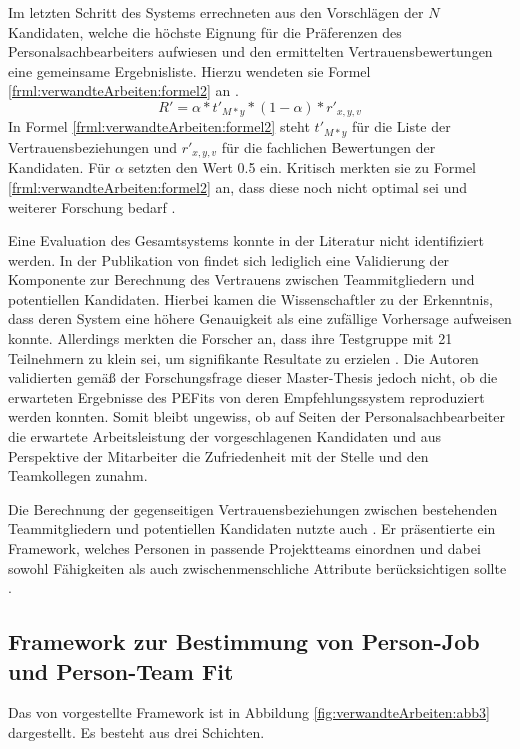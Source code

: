 Im letzten Schritt des Systems errechneten \textcite[S. 9f.]{malinowski:2005} aus den Vorschlägen der $N$ Kandidaten, welche die höchste Eignung für die Präferenzen des Personalsachbearbeiters aufwiesen und den ermittelten Vertrauensbewertungen eine gemeinsame Ergebnisliste. Hierzu wendeten sie Formel \ref{frml:verwandteArbeiten:formel2} an \cite[S.10]{malinowski:2005}.
\begin{equation}
	R' = \alpha * t'_{M*y} * (1-\alpha) * r'_{x,y,v}
	\label{frml:verwandteArbeiten:formel2}
\end{equation}
In Formel \ref{frml:verwandteArbeiten:formel2} steht $t'_{M*y}$ für die Liste der Vertrauensbeziehungen und $r'_{x,y,v}$ für die fachlichen Bewertungen der Kandidaten. Für $\alpha$ setzten \textcite[S. 4ff.]{malinowski:2005} den Wert 0.5 ein. Kritisch merkten sie zu Formel \ref{frml:verwandteArbeiten:formel2} an, dass diese noch nicht optimal sei und weiterer Forschung bedarf \cite[S. 9]{malinowski:2005}.

Eine Evaluation des Gesamtsystems konnte in der Literatur nicht identifiziert werden. In der Publikation von \textcite[S. 13ff.]{malinowski:2008} findet sich lediglich eine Validierung der Komponente zur Berechnung des Vertrauens zwischen Teammitgliedern und potentiellen Kandidaten. Hierbei kamen die Wissenschaftler zu der Erkenntnis, dass deren System eine höhere Genauigkeit als eine zufällige Vorhersage aufweisen konnte. Allerdings merkten die Forscher an, dass ihre Testgruppe mit 21 Teilnehmern zu klein sei, um signifikante Resultate zu erzielen \cite[S. 13ff.]{malinowski:2008}. Die Autoren validierten gemäß der Forschungsfrage dieser Master-Thesis jedoch nicht, ob die erwarteten Ergebnisse des \acp{PEFit} von deren Empfehlungssystem reproduziert werden konnten. Somit bleibt ungewiss, ob auf Seiten der Personalsachbearbeiter die erwartete Arbeitsleistung der vorgeschlagenen Kandidaten und aus Perspektive der Mitarbeiter die Zufriedenheit mit der Stelle und den Teamkollegen zunahm.

Die Berechnung der gegenseitigen Vertrauensbeziehungen zwischen bestehenden Teammitgliedern und potentiellen Kandidaten nutzte auch \textcite[S. 1ff.]{keim:2007}. Er präsentierte ein Framework, welches Personen in passende Projektteams einordnen und dabei sowohl Fähigkeiten als auch zwischenmenschliche Attribute berücksichtigen sollte \cite[S. 1ff.]{keim:2007}.

\subsection{Framework zur Bestimmung von Person-Job und Person-Team Fit}
\label{ch:verwandteArbeiten:aufDemPEFitBasierendeBilateraleSysteme:pjUndPtFit}
Das von \textcite[S. 5]{keim:2007} vorgestellte Framework ist in Abbildung \ref{fig:verwandteArbeiten:abb3} dargestellt. Es besteht aus drei Schichten.

